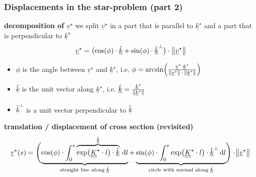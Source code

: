 \begin{frame}
  \frametitle{Displacements in the star-problem (part 2)}
  
  \textbf{decomposition of $\underline{v}^{\star}$} \newline
  we split $\underline{v}^{\star}$ in a part that is parallel to $\underline{k}^{\star}$ and a part that is perpendicular to $\underline{k}^{\star}$
  \begin{displaymath}
    \underline{v}^{\star} = \bigl( \cos(\phi) \cdot \underline{\hat{k}} + \sin(\phi) \cdot \underline{\hat{k}}^{\perp} \bigr) \cdot \, \norm[1]{\underline{v}^{\star}}
  \end{displaymath}
  \begin{itemize}
    \item $\phi$ is the angle between $\underline{v}^{\star}$ and $\underline{k}^{\star}$, i.e. $\phi = \arcsin \Bigl( \frac{\underline{v}^{\star} \cdot \underline{k}^{\star}}{\norm[0]{\underline{v}^{\star}} \, \cdot \: \norm[0]{\underline{k}^{\star}}} \Bigr)$
    \item $\underline{\hat{k}}$ is the unit vector along $\underline{k}^{\star}$, i.e. $\underline{\hat{k}} = \frac{\underline{k}^{\star}}{\norm[0]{\underline{k}^{\star}}}$
    \item $\underline{\hat{k}}^{\perp}$ is a unit vector perpendicular to $\underline{\hat{k}}$
  \end{itemize}
  
  \vspace{0.5em}
  \textbf{translation / displacement of cross section (revisited)}
  \begin{displaymath}
    \underline{r}^{\star}(s) = \Biggl( \underbrace{\cos(\phi) \cdot \int_0^s \overbrace{\exp \bigl( \doubleunderline{K}^{\star} \cdot l \bigr) \cdot \underline{\hat{k}} }^{\underline{\hat{k}}} \, \dif l}_{\text{straight line along }\underline{\hat{k}}}  + \underbrace{ \sin(\phi) \cdot \int_0^s \exp \bigl( \doubleunderline{K}^{\star} \cdot l \bigr) \cdot \underline{\hat{k}}^{\perp} \dif l}_{\text{circle with normal along }\underline{\hat{k}}} \Biggr) \cdot \norm[1]{\underline{v}^{\star}}
  \end{displaymath}
  
\end{frame}


